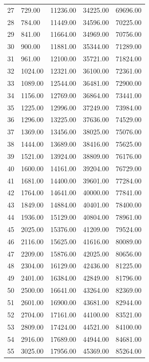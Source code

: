\documentclass{amsart}
\begin{document}
\begin{table}[ht]
\begin{tabular}{lllll}
  27 & 729.00 & 11236.00 & 34225.00 & 69696.00 \\
  28 & 784.00 & 11449.00 & 34596.00 & 70225.00 \\
  29 & 841.00 & 11664.00 & 34969.00 & 70756.00 \\
  30 & 900.00 & 11881.00 & 35344.00 & 71289.00 \\
  31 & 961.00 & 12100.00 & 35721.00 & 71824.00 \\
  32 & 1024.00 & 12321.00 & 36100.00 & 72361.00 \\
  33 & 1089.00 & 12544.00 & 36481.00 & 72900.00 \\
  34 & 1156.00 & 12769.00 & 36864.00 & 73441.00 \\
  35 & 1225.00 & 12996.00 & 37249.00 & 73984.00 \\
  36 & 1296.00 & 13225.00 & 37636.00 & 74529.00 \\
  37 & 1369.00 & 13456.00 & 38025.00 & 75076.00 \\
  38 & 1444.00 & 13689.00 & 38416.00 & 75625.00 \\
  39 & 1521.00 & 13924.00 & 38809.00 & 76176.00 \\
  40 & 1600.00 & 14161.00 & 39204.00 & 76729.00 \\
  41 & 1681.00 & 14400.00 & 39601.00 & 77284.00 \\
  42 & 1764.00 & 14641.00 & 40000.00 & 77841.00 \\
  43 & 1849.00 & 14884.00 & 40401.00 & 78400.00 \\
  44 & 1936.00 & 15129.00 & 40804.00 & 78961.00 \\
  45 & 2025.00 & 15376.00 & 41209.00 & 79524.00 \\
  46 & 2116.00 & 15625.00 & 41616.00 & 80089.00 \\
  47 & 2209.00 & 15876.00 & 42025.00 & 80656.00 \\
  48 & 2304.00 & 16129.00 & 42436.00 & 81225.00 \\
  49 & 2401.00 & 16384.00 & 42849.00 & 81796.00 \\
  50 & 2500.00 & 16641.00 & 43264.00 & 82369.00 \\
  51 & 2601.00 & 16900.00 & 43681.00 & 82944.00 \\
  52 & 2704.00 & 17161.00 & 44100.00 & 83521.00 \\
  53 & 2809.00 & 17424.00 & 44521.00 & 84100.00 \\
  54 & 2916.00 & 17689.00 & 44944.00 & 84681.00 \\
  55 & 3025.00 & 17956.00 & 45369.00 & 85264.00 \\

\end{tabular}
\end{table}
\end{document}
